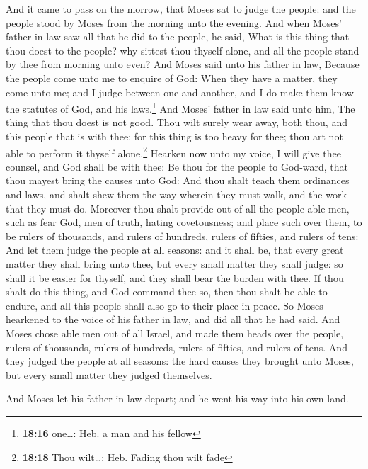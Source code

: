  And it came to pass on the morrow, that Moses sat to
judge the people: and the people stood by Moses from the morning unto
the evening.  And when Moses' father in law saw all that
he did to the people, he said, What is this thing that thou doest to the
people? why sittest thou thyself alone, and all the people stand by thee
from morning unto even?  And Moses said unto his father
in law, Because the people come unto me to enquire of God:
 When they have a matter, they come unto me; and I judge
between one and another, and I do make them know the statutes of God,
and his laws.\footnote{\textbf{18:16} one\ldots: Heb. a man and his
  fellow}  And Moses' father in law said unto him, The
thing that thou doest is not good.  Thou wilt surely wear
away, both thou, and this people that is with thee: for this thing is
too heavy for thee; thou art not able to perform it thyself
alone.\footnote{\textbf{18:18} Thou wilt\ldots: Heb. Fading thou wilt
  fade}  Hearken now unto my voice, I will give thee
counsel, and God shall be with thee: Be thou for the people to God-ward,
that thou mayest bring the causes unto God:  And thou
shalt teach them ordinances and laws, and shalt shew them the way
wherein they must walk, and the work that they must do. 
Moreover thou shalt provide out of all the people able men, such as fear
God, men of truth, hating covetousness; and place such over them, to be
rulers of thousands, and rulers of hundreds, rulers of fifties, and
rulers of tens:  And let them judge the people at all
seasons: and it shall be, that every great matter they shall bring unto
thee, but every small matter they shall judge: so shall it be easier for
thyself, and they shall bear the burden with thee.  If
thou shalt do this thing, and God command thee so, then thou shalt be
able to endure, and all this people shall also go to their place in
peace.  So Moses hearkened to the voice of his father in
law, and did all that he had said.  And Moses chose able
men out of all Israel, and made them heads over the people, rulers of
thousands, rulers of hundreds, rulers of fifties, and rulers of tens.
 And they judged the people at all seasons: the hard
causes they brought unto Moses, but every small matter they judged
themselves.

 And Moses let his father in law depart; and he went his
way into his own land.

